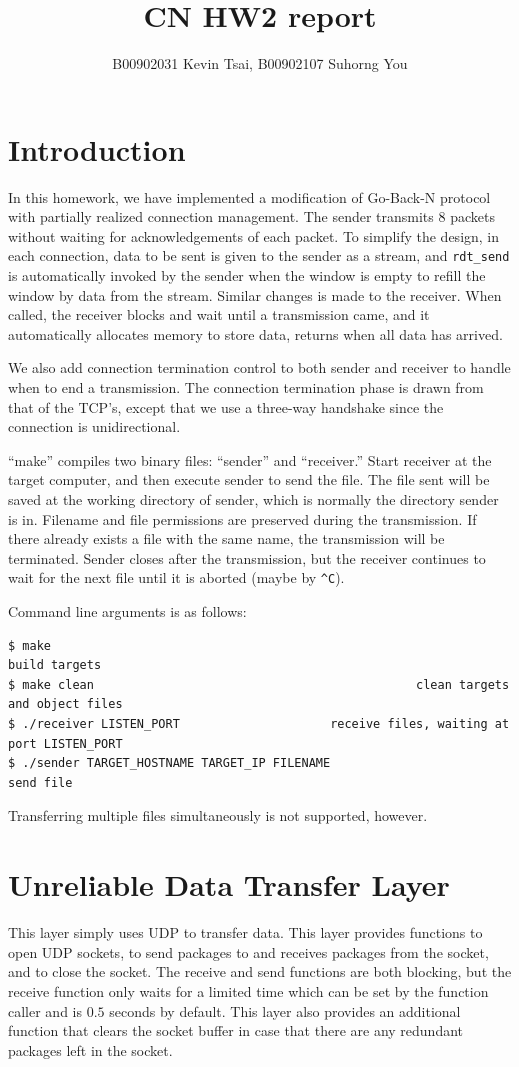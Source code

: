 \documentclass[10pt,a4paper]{article}
\author{B00902031 Kevin Tsai, B00902107 Suhorng You}
\title{CN HW2 report}
\begin{document}
\maketitle

\section{Introduction}
    In this homework, we have implemented a modification of Go-Back-N protocol with partially realized connection management. The sender transmits $8$ packets without waiting for acknowledgements of each packet. To simplify the design, in each connection, data to be sent is given to the sender as a stream, and \texttt{rdt\_send} is automatically invoked by the sender when the window is empty to refill the window by data from the stream. Similar changes is made to the receiver. When called, the receiver blocks and wait until a transmission came, and it automatically allocates memory to store data, returns when all data has arrived.

    We also add connection termination control to both sender and receiver to handle when to end a transmission. The connection termination phase is drawn from that of the TCP's, except that we use a three-way handshake since the connection is unidirectional.

    ``make'' compiles two binary files: ``sender'' and ``receiver.'' Start receiver at the target computer, and then execute sender to send the file. The file sent will be saved at the working directory of sender, which is normally the directory sender is in. Filename and file permissions are preserved during the transmission. If there already exists a file with the same name, the transmission will be terminated. Sender closes after the transmission, but the receiver continues to wait for the next file until it is aborted (maybe by \texttt{\^{}C}).

    Command line arguments is as follows:
\begin{verbatim}
$ make                                                                    build targets
$ make clean                                             clean targets and object files
$ ./receiver LISTEN_PORT                     receive files, waiting at port LISTEN_PORT
$ ./sender TARGET_HOSTNAME TARGET_IP FILENAME                                 send file
\end{verbatim}

    Transferring multiple files simultaneously is not supported, however.
\section{Unreliable Data Transfer Layer}
    This layer simply uses UDP to transfer data. This layer provides functions to open UDP sockets, to send packages to and receives packages from the socket, and to close the socket. The receive and send functions are both blocking, but the receive function only waits for a limited time which can be set by the function caller and is $0.5$ seconds by default. This layer also provides an additional function that clears the socket buffer in case that there are any redundant packages left in the socket.
\end{document}
